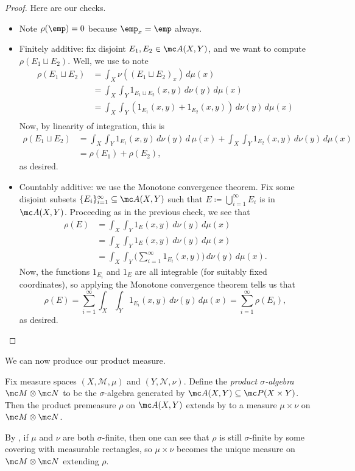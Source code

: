 \documentclass[../notes.tex]{subfiles}
\begin{document}
\begin{proof}
	Here are our checks.
	\begin{itemize}
		\item Note $\rho(\emp)=0$ because $\emp_x=\emp$ always.
		\item Finitely additive: fix disjoint $E_1,E_2\in\mc A(X,Y)$, and we want to compute $\rho(E_1\sqcup E_2)$. Well, we use  to note
		\begin{align*}
			\rho(E_1\sqcup E_2) &= \int_X\nu((E_1\sqcup E_2)_x)\,d\mu(x) \\
			&= \int_X\int_Y1_{E_1\sqcup E_2}(x,y)\,d\nu(y)\,d\mu(x) \\
			&=  \int_X\int_Y(1_{E_1}(x,y)+1_{E_2}(x,y))\,d\nu(y)\,d\mu(x) \\
		\end{align*}
		Now, by linearity of integration, this is
		\begin{align*}
			\rho(E_1\sqcup E_2) &= \int_X\int_Y1_{E_1}(x,y)\,d\nu(y)\,d\,\mu(x)+\int_X\int_Y1_{E_2}(x,y)\,d\nu(y)\,d\mu(x) \\
			&= \rho(E_1)+\rho(E_2),
		\end{align*}
		as desired.
		\item Countably additive: we use the Monotone convergence theorem. Fix some disjoint subsets $\{E_i\}_{i=1}^\infty\subseteq\mc A(X,Y)$ such that $E\coloneqq\bigcup_{i=1}^\infty E_i$ is in $\mc A(X,Y)$. Proceeding as in the previous check, we see that
		\begin{align*}
			\rho(E) &= \int_X\int_Y1_E(x,y)\,d\nu(y)\,d\mu(x) \\
			&= \int_X\int_Y1_E(x,y)\,d\nu(y)\,d\mu(x) \\
			&= \int_X\int_Y\Bigg(\sum_{i=1}^\infty 1_{E_i}(x,y)\Bigg)\,d\nu(y)\,d\mu(x).
		\end{align*}
		Now, the functions $1_{E_i}$ and $1_E$ are all integrable (for suitably fixed coordinates), so applying the Monotone convergence theorem \cite[Theorem~9.18]{elber-top} tells us that
		\[\rho(E)=\sum_{i=1}^\infty\int_X\int_Y1_{E_i}(x,y)\,d\nu(y)\,d\mu(x)=\sum_{i=1}^\infty\rho(E_i),\]
		as desired.
		\qedhere
	\end{itemize}
\end{proof}
We can now produce our product measure.
\begin{definition}
	Fix measure spaces $(X,\mathcal M,\mu)$ and $(Y,\mathcal N,\nu)$. Define the \textit{product $\sigma$-algebra} $\mc M\otimes\mc N$ to be the $\sigma$-algebra generated by $\mc A(X,Y)\subseteq\mc P(X\times Y)$. Then the product premeasure $\rho$ on $\mc A(X,Y)$ extends by  to a measure $\mu\times\nu$ on $\mc M\otimes\mc N$.
\end{definition}
\begin{remark}
	By , if $\mu$ and $\nu$ are both $\sigma$-finite, then one can see that $\rho$ is still $\sigma$-finite by some covering with measurable rectangles, so $\mu\times\nu$ becomes the unique measure on $\mc M\otimes\mc N$ extending $\rho$.
\end{remark}
\end{document}
